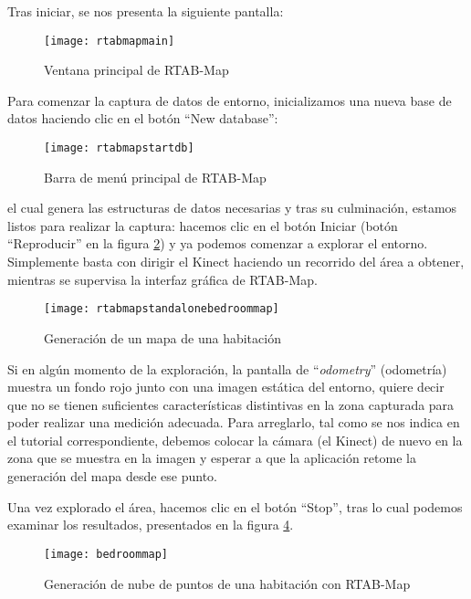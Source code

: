 Tras iniciar, se nos presenta la siguiente pantalla:

\begin{figure}[H]
\centering
\texttt{[image: rtabmapmain]}
\caption{Ventana principal de RTAB-Map}
\label{figure:rtabmapmain}
\end{figure}

Para comenzar la captura de datos de entorno, inicializamos una nueva base de datos haciendo clic en el botón ``New database'':

\begin{figure}[H]
\centering
\texttt{[image: rtabmapstartdb]}
\caption{Barra de menú principal de RTAB-Map}
\label{figure:rtabmapstartdb}
\end{figure}

\noindent el cual genera las estructuras de datos necesarias y tras su culminación, estamos listos para realizar la captura: hacemos clic en el botón Iniciar (botón ``Reproducir'' en la figura \ref{figure:rtabmapstartdb}) y ya podemos comenzar a explorar el entorno. Simplemente basta con dirigir el Kinect haciendo un recorrido del área a obtener, mientras se supervisa la interfaz gráfica de RTAB-Map.

\begin{figure}[H]
\centering
\texttt{[image: rtabmapstandalonebedroommap]}
\caption{Generación de un mapa de una habitación}
\label{figure:rtabmapstandalonebedroommap}
\end{figure}

Si en algún momento de la exploración, la pantalla de ``\textit{odometry}'' (odometría) muestra un fondo rojo junto con una imagen estática del entorno, quiere decir que no se tienen suficientes características distintivas en la zona capturada para poder realizar una medición adecuada. Para arreglarlo, tal como se nos indica en el tutorial correspondiente, debemos colocar la cámara (el Kinect) de nuevo en la zona que se muestra en la imagen y esperar a que la aplicación retome la generación del mapa desde ese punto.

Una vez explorado el área, hacemos clic en el botón ``Stop'', tras lo cual podemos examinar los resultados, presentados en la figura \ref{figure:bedroommap}.

\begin{figure}[H]
\centering
\texttt{[image: bedroommap]}
\caption{Generación de nube de puntos de una habitación con RTAB-Map}
\label{figure:bedroommap}
\end{figure}

